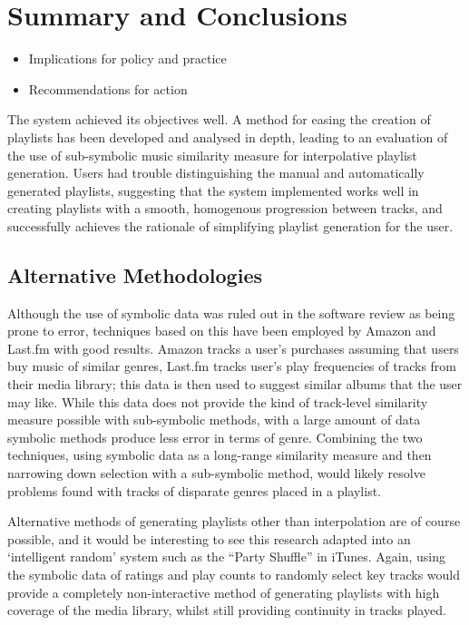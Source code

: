 \chapter{Summary and Conclusions}
\begin{itemize}
	\item Implications for policy and practice
	\item Recommendations for action
\end{itemize}
The system achieved its objectives well. A method for easing the creation of playlists has been developed and analysed in depth, leading to an evaluation of the use of sub-symbolic music similarity measure for interpolative playlist generation. Users had trouble distinguishing the manual and automatically generated playlists, suggesting that the system implemented works well in creating playlists with a smooth, homogenous progression between tracks, and successfully achieves the rationale of simplifying playlist generation for the user.
\section{Alternative Methodologies}
Although the use of symbolic data was ruled out in the software review as being prone to error, techniques based on this have been employed by Amazon and Last.fm with good results. Amazon tracks a user's purchases assuming that users buy music of similar genres, Last.fm tracks user's play frequencies of tracks from their media library; this data is then used to suggest similar albums that the user may like. While this data does not provide the kind of track-level similarity measure possible with sub-symbolic methods, with a large amount of data symbolic methods produce less error in terms of genre. Combining the two techniques, using symbolic data as a long-range similarity measure and then narrowing down selection with a sub-symbolic method, would likely resolve problems found with tracks of disparate genres placed in a playlist.

Alternative methods of generating playlists other than interpolation are of course possible, and it would be interesting to see this research adapted into an `intelligent random' system such as the ``Party Shuffle'' in iTunes. Again, using the symbolic data of ratings and play counts to randomly select key tracks would provide a completely non-interactive method of generating playlists with high coverage of the media library, whilst still providing continuity in tracks played.
